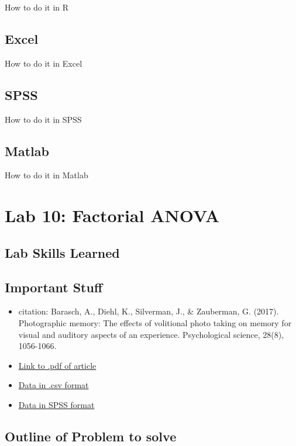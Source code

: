 \documentclass[]{book}
\providecommand{\tightlist}{%
  \setlength{\itemsep}{0pt}\setlength{\parskip}{0pt}}
\theoremstyle{definition}
\theoremstyle{definition}
\theoremstyle{definition}
\theoremstyle{remark}
\begin{document}
How to do it in R

\section{Excel}\label{excel-8}

How to do it in Excel

\section{SPSS}\label{spss-8}

How to do it in SPSS

\section{Matlab}\label{matlab-8}

How to do it in Matlab

\chapter{Lab 10: Factorial ANOVA}\label{lab-10-factorial-anova}

\section{Lab Skills Learned}\label{lab-skills-learned-4}

\section{Important Stuff}\label{important-stuff-4}

\begin{itemize}
\tightlist
\item
  citation: Barasch, A., Diehl, K., Silverman, J., \& Zauberman, G.
  (2017). Photographic memory: The effects of volitional photo taking on
  memory for visual and auditory aspects of an experience. Psychological
  science, 28(8), 1056-1066.
\item
  \href{http://journals.sagepub.com/doi/abs/10.1177/0956797617694868}{Link
  to .pdf of article}
\item
  \href{}{Data in .csv format}
\item
  \href{}{Data in SPSS format}
\end{itemize}

\section{Outline of Problem to
solve}\label{outline-of-problem-to-solve-5}
\end{document}
